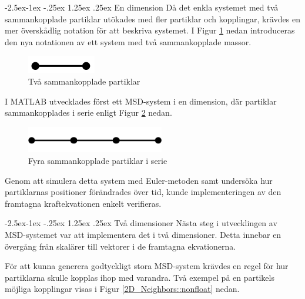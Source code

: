 \documentclass[a4paper,12pt,oneside,final,swedish]{extarticle}
\makeatletter
\renewcommand\paragraph{\@startsection{paragraph}{4}{\z@}%
            {-2.5ex\@plus -1ex \@minus -.25ex}%
            {1.25ex \@plus .25ex}%
            {\normalfont\normalsize\bfseries}}
\makeatother
\begin{document}
\paragraph{En dimension}
Då det enkla systemet med två sammankopplade partiklar utökades med fler partiklar och kopplingar, krävdes en mer överskådlig notation för att beskriva systemet. 
I Figur \ref{2D_simple::nonfloat} nedan introduceras den nya notationen av ett system med två sammankopplade massor.

\begin{figure}[h!]
  \begin{center}
    \includegraphics[width=3cm]{Bilder/2D_simple.png} 
  \end{center}
  \caption{Två sammankopplade partiklar}
  \label{2D_simple::nonfloat}
\end{figure}
\noindent I MATLAB utvecklades först ett MSD-system i en dimension, där partiklar sammankopplades i serie enligt Figur \ref{simple1D4::nonfloat} nedan.
\begin{figure}[h!]
  \begin{center}
    \includegraphics[width=6cm]{Bilder/simple1D4.png} 
  \end{center}
  \caption{Fyra sammankopplade partiklar i serie}
  \label{simple1D4::nonfloat}
\end{figure}

\noindent Genom att simulera detta system med Euler-metoden samt undersöka hur partiklarnas positioner förändrades över tid, kunde implementeringen av den framtagna kraftekvationen enkelt verifieras.

\paragraph{Två dimensioner}
Nästa steg i utvecklingen av MSD-systemet var att implementera det i två dimensioner. 
Detta innebar en övergång från skalärer till vektorer i de framtagna ekvationerna.
\pagebreak


\noindent För att kunna generera godtyckligt stora MSD-system krävdes en regel för hur partiklarna skulle kopplas ihop med varandra. Två exempel på en partikels möjliga kopplingar visas i Figur \ref{2D_Neighbors::nonfloat} nedan.
\end{document}
